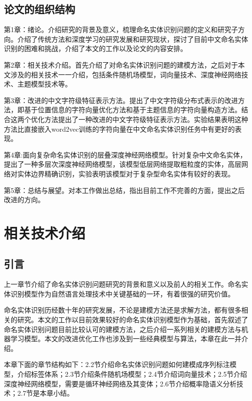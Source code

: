 \documentclass[winfonts,master,oneside,nobackinfo]{njuthesis}
\begin{document}
\section{论文的组织结构}
第1章：绪论。介绍研究的背景及意义，梳理命名实体识别问题的定义和研究子方向。介绍了传统方法和深度学习的研究发展和研究现状，探讨了目前中文命名实体识别的困难和挑战，介绍了本文的工作以及论文的内容安排。

第2章：相关技术介绍。首先介绍了对命名实体识别问题的建模方法，之后对于本文涉及的相关技术一一介绍，包括条件随机场模型，词向量技术、深度神经网络技术、主题模型技术等。

第3章：改进的中文字符级特征表示方法。提出了中文字符级分布式表示的改进方法，即基于位置信息的字符向量优化方法和基于主题信息的字符向量构造方法。结合这两个优化方法提出了一种改进的中文字符级特征表示方法。实验结果表明这种方法比直接嵌入word2vec训练的字符向量在中文命名实体识别任务中有更好的表现。

第4章:面向复杂命名实体识别的层叠深度神经网络模型。针对复杂中文命名实体，提出了一种多层次深度神经网络模型，该模型低层网络提取粗粒度的实体，高层网络对实体边界精确识别，实验表明该模型对于复杂型命名实体有较好的表现。

第5章：总结与展望。对本工作做出总结，指出目前工作不完善的方面，提出之后改进的方向。

\chapter{相关技术介绍}

\section{引言}
上一章节介绍了命名实体识别问题研究的背景和意义以及前人的相关工作。命名实体识别模型作为自然语言处理技术中关键基础的一环，有着很强的研究价值。

命名实体识别历经数十年的研究发展，不论是建模方法还是求解方法，都有很多相关的研究。本文的工作以目前效果较好的命名实体识别模型作为基础，首先叙述了命名实体识别问题目前比较认可的建模方法，之后介绍一系列相关的建模方法与机器学习模型。本文的改进优化工作也涉及到一些经典模型与算法，本章在此一并介绍。

本章下面的章节结构如下：2.2节介绍命名实体识别问题如何建模成序列标注模型，介绍标签体系；2.3节介绍条件随机场模型；2.4节介绍词向量技术；2.5节介绍深度神经网络模型，需要是循环神经网络及其变体；2.6节介绍概率隐语义分析技术；2.7节是本章小结。
\end{document}
